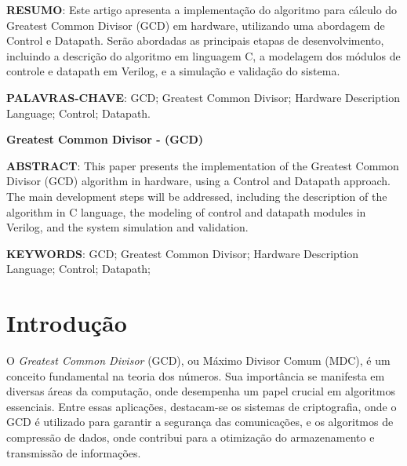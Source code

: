 \documentclass[a4paper,11pt]{article} %
\begin{document}


\begin{center}
    \tableofcontents %
\end{center}

\newpage


\vspace{0.5cm}
\noindent\textbf{RESUMO}:
Este artigo apresenta a implementação do algoritmo para cálculo do
Greatest Common Divisor (GCD) em hardware,
utilizando uma abordagem de Control e Datapath.
Serão abordadas as principais etapas de desenvolvimento,
incluindo a descrição do algoritmo em linguagem C,
a modelagem dos módulos de controle e datapath em Verilog,
e a simulação e validação do sistema.

\vspace{0.5cm}
\noindent\textbf{PALAVRAS-CHAVE}:
GCD; Greatest Common Divisor; Hardware Description Language; Control; Datapath.

\vspace{0.5cm}
\begin{center}
    \textbf{Greatest Common Divisor - (GCD)}
\end{center}

\noindent\textbf{ABSTRACT}:
This paper presents the implementation of the Greatest Common Divisor (GCD)
algorithm in hardware, using a Control and Datapath approach.
The main development steps will be addressed,
including the description of the algorithm in C language,
the modeling of control and datapath modules in Verilog,
and the system simulation and validation.

\vspace{0.5cm}
\noindent\textbf{KEYWORDS}:
GCD; Greatest Common Divisor; Hardware Description Language; Control; Datapath;

\section{Introdução}

O \textit{Greatest Common Divisor} (GCD), ou Máximo Divisor Comum (MDC), é um conceito fundamental na teoria dos números. Sua importância se manifesta em diversas áreas da computação, onde desempenha um papel crucial em algoritmos essenciais. Entre essas aplicações, destacam-se os sistemas de criptografia, onde o GCD é utilizado para garantir a segurança das comunicações, e os algoritmos de compressão de dados, onde contribui para a otimização do armazenamento e transmissão de informações.
\end{document}

